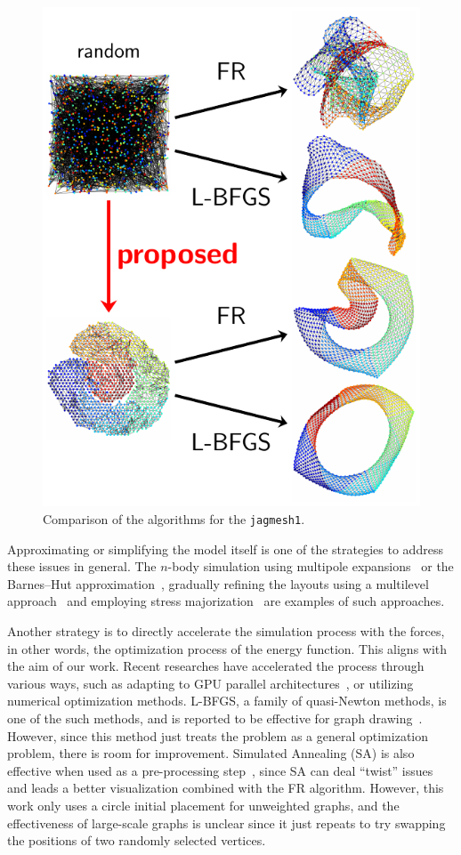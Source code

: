 \documentclass[dvipdfmx,10pt,journal,compsoc]{IEEEtran}
\begin{document}
\begin{figure}[t]
  \centering
  \includegraphics[width=0.8\columnwidth]{fig1/fig1.pdf}
  \caption{
    Comparison of the algorithms for the \texttt{jagmesh1}.
  }
  \label{fig:fig1}
\end{figure}

Approximating or simplifying the model itself is one of the strategies to address these issues in general.
The $n$-body simulation using multipole expansions~\cite{greengardFastAlgorithmParticle1987} or the Barnes--Hut approximation~\cite{barnesHierarchicalLogForcecalculation1986}, gradually refining the layouts using a multilevel approach~\cite{Hu2006EfficientHF} and employing stress majorization~\cite{gansnerGraphDrawingStress2005} are examples of such approaches.

Another strategy is to directly accelerate the simulation process with the forces, in other words, the optimization process of the energy function.
This aligns with the aim of our work.
Recent researches have accelerated the process through various ways, such as adapting to GPU parallel architectures~\cite{gajdosParallelFruchtermanReingold2016}, or utilizing numerical optimization methods.
L-BFGS, a family of quasi-Newton methods, is one of the such methods, and is reported to be effective for graph drawing~\cite{6183577}.
However, since this method just treats the problem as a general optimization problem, there is room for improvement.
Simulated Annealing (SA) is also effective when used as a pre-processing step~\cite{ghassemitoosiSimulatedAnnealingPreProcessing2016}, since SA can deal ``twist'' issues and leads a better visualization combined with the FR algorithm.
However, this work only uses a circle initial placement for unweighted graphs, and the effectiveness of large-scale graphs is unclear since it just repeats to try swapping the positions of two randomly selected vertices.
\end{document}
